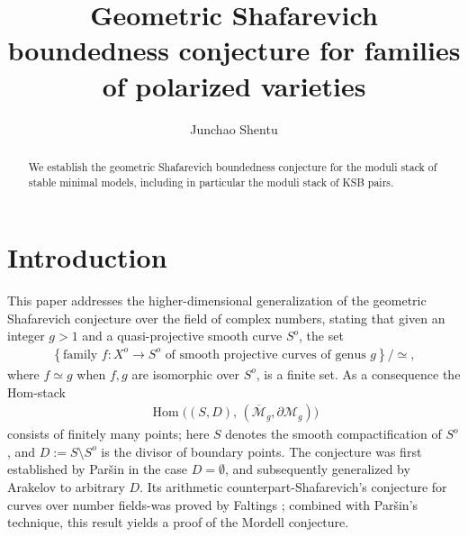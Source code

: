 \documentclass[11pt,letterpaper]{amsart}
\numberwithin{equation}{section}
\begin{document}
	\title[Boundedness of families] {Geometric Shafarevich boundedness conjecture for families of polarized varieties}
	
	\author[Junchao Shentu]{Junchao Shentu}
	\address{School of Mathematical Sciences,
		University of Science and Technology of China, Hefei, 230026, China}
	
	
	\begin{abstract}
		We establish the geometric Shafarevich boundedness conjecture for the moduli stack of stable minimal models, including in particular the moduli stack of KSB pairs.
	\end{abstract}
	
	\maketitle
	\section{Introduction}
	This paper addresses the higher-dimensional generalization of the geometric Shafarevich conjecture over the field of complex numbers, stating that given an integer $g>1$ and a quasi-projective smooth curve $S^o$, the set
	\begin{align}\label{align_Shafa_conj_set}
		\left\{\textrm{family } f:X^o\to S^o\textrm{ of smooth projective curves of genus }g\right\}/\simeq,
	\end{align}
	where $f\simeq g$ when $f,g$ are isomorphic over $S^o$, is a finite set. As a consequence the Hom-stack  
	\begin{align}\label{align_Homstack_Mg}
		\operatorname{Hom}\big((S,D),\,(\overline{\mathcal{M}}_g,\partial\mathcal{M}_g)\big)
	\end{align}  
	consists of finitely many points; here $S$ denotes the smooth compactification of $S^o$, and $D := S \setminus S^o$ is the divisor of boundary points. The conjecture was first established by Par\v{s}in \cite{Parsin1968} in the case $D = \emptyset$, and subsequently generalized by Arakelov \cite{Arakelov1971} to arbitrary $D$. Its arithmetic counterpart-Shafarevich’s conjecture for curves over number fields-was proved by Faltings \cite{Faltings19832}; combined with Par\v{s}in's technique, this result yields a proof of the Mordell conjecture. 
	
\end{document}
